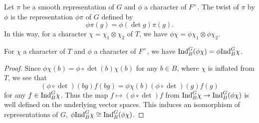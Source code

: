 \begin{defn}
    Let $\pi$ be a smooth representation of $G$ and $\phi$ a character of $F^\times$. The twist of $\pi$ by $\phi$ is the representation $\phi\pi$ of $G$ defined by 
    $$\phi \pi(g) = \phi (\det g)\pi(g).$$
    In this way, for a character $\chi=\chi_1 \otimes \chi_2$ of $T$, we have $\phi\chi = \phi\chi_1 \otimes \phi\chi_2$. 
\end{defn}

\begin{lemma}
    For $\chi$ a character of $T$ and $\phi$ a character of $F^\times$, we have $\mathrm{Ind}_B^G(\phi\chi) = \phi\mathrm{Ind}_B^G \chi$.
\end{lemma}
\begin{proof}
    Since $\phi\chi(b) = \phi \circ \det(b) \chi(b)$ for any $b \in B$, where $\chi$ is inflated from $T$, we see that 
    $$(\phi \circ \det)(bg)f(bg) = \phi\chi(b)(\phi \circ \det)(g)f(g)$$ for any $f \in \mathrm{Ind}_B^G \chi$. Thus the map $f \mapsto (\phi \circ \det)f$ from $\mathrm{Ind}_B^G \chi \to \mathrm{Ind}_B^G(\phi\chi)$ is well defined on the underlying vector spaces. This induces an isomorphism of representations of $G$, $\phi\mathrm{Ind}_B^G \chi \cong \mathrm{Ind}_B^G(\phi\chi)$.
\end{proof}

